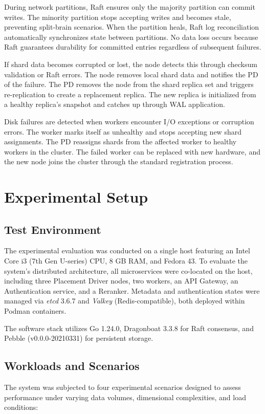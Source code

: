 \documentclass[conference]{IEEEtran}
\begin{document}
During network partitions, Raft ensures only the majority partition can commit writes. The minority partition stops accepting writes and becomes stale, preventing split-brain scenarios. When the partition heals, Raft log reconciliation automatically synchronizes state between partitions. No data loss occurs because Raft guarantees durability for committed entries regardless of subsequent failures.

If shard data becomes corrupted or lost, the node detects this through checksum validation or Raft errors. The node removes local shard data and notifies the PD of the failure. The PD removes the node from the shard replica set and triggers re-replication to create a replacement replica. The new replica is initialized from a healthy replica's snapshot and catches up through WAL application.

Disk failures are detected when workers encounter I/O exceptions or corruption errors. The worker marks itself as unhealthy and stops accepting new shard assignments. The PD reassigns shards from the affected worker to healthy workers in the cluster. The failed worker can be replaced with new hardware, and the new node joins the cluster through the standard registration process.

\section{Experimental Setup}

\subsection{Test Environment}
The experimental evaluation was conducted on a single host featuring an Intel Core i3 (7th Gen U-series) CPU, 8 GB RAM, and Fedora 43. To evaluate the system's distributed architecture, all microservices were co-located on the host, including three Placement Driver nodes, two workers, an API Gateway, an Authentication service, and a Reranker. Metadata and authentication states were managed via \textit{etcd} 3.6.7 and \textit{Valkey} (Redis-compatible), both deployed within Podman containers.

The software stack utilizes Go 1.24.0, Dragonboat 3.3.8 for Raft consensus, and Pebble (v0.0.0-20210331) for persistent storage.

\subsection{Workloads and Scenarios}
The system was subjected to four experimental scenarios designed to assess performance under varying data volumes, dimensional complexities, and load conditions:
\end{document}
